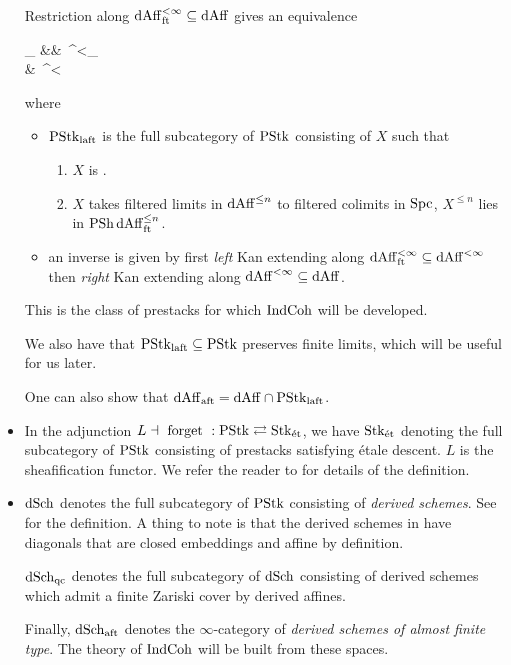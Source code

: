 \documentclass[./main.tex]{subfiles}
\begin{document}
\begin{itemize}
\begin{prop}
		Restriction along $\mathrm{dAff}^{<\infty}_{\mathrm{ft}} \subseteq \mathrm{dAff}$
		gives an equivalence \begin{cd}
			{\PSTK_\LAFT} && {\PSH\,\DAFF^{<\infty}_\FT} \\
			& {\PSH\,\DAFF^{<\infty}}
			\arrow["{\mathrm{res}}", shift left=2, from=1-1, to=1-3]
			\arrow["\sim"{description}, draw=none, from=1-1, to=1-3]
			\arrow[shift left=2, from=1-3, to=1-1]
			\arrow["\RAN", shorten >=3pt, from=2-2, to=1-1]
			\arrow["\LAN", shorten <=4pt, from=1-3, to=2-2]
		\end{cd}
		where \begin{itemize}
			\item $\mathrm{PStk}_{\mathrm{laft}}$ is the full subcategory of $\mathrm{PStk}$ consisting of
      $X$ such that \begin{enumerate}
				\item $X$ is .
        \item $X$ takes filtered limits in $\mathrm{dAff}^{\leq n}$ to 
				filtered colimits in $\mathrm{Spc}$,
				$X^{\leq n}$ lies in $\mathrm{PSh}\,\mathrm{dAff}^{\leq n}_{\mathrm{ft}}$.
			\end{enumerate}
			\item an inverse is given by 
			first \emph{left} Kan extending along 
			$\mathrm{dAff}^{<\infty}_{\mathrm{ft}} \subseteq \mathrm{dAff}^{<\infty}$
			then \emph{right} Kan extending along $\mathrm{dAff}^{<\infty} \subseteq \mathrm{dAff}$.
		\end{itemize}
		\cite[Ch 2, 1.7.6]{GR1}
	\end{prop}
	This is the class of prestacks for which
	$\mathrm{IndCoh}$ will be developed.

  We also have that
	$\mathrm{PStk}_{\mathrm{laft}} \subseteq \mathrm{PStk}$ preserves finite limits,
	which will be useful for us later.
	\cite[Ch 2 , 1.7.10]{GR1}

  One can also show that
	$\mathrm{dAff}_{\mathrm{aft}} = \mathrm{dAff} \cap \mathrm{PStk}_{\mathrm{laft}}$.
	\cite[Ch 2 , 1.7.2]{GR1}

	\item In the adjunction 
	$L \dashv \text{ forget } : \mathrm{PStk} \rightleftarrows \mathrm{Stk}_\text{ét}$,
	we have $\mathrm{Stk}_\text{ét}$ denoting the full subcategory of $\mathrm{PStk}$
	consisting of prestacks satisfying étale descent.
	$L$ is the sheafification functor.
	We refer the reader to \cite[Ch 2, 2.3]{GR1}
	for details of the definition.

	\item $\mathrm{dSch}$ denotes the full subcategory of $\mathrm{PStk}$ consisting of
	\emph{derived schemes}. 
	See \cite[Ch 2, 3.1.1]{GR1} for the definition.
	A thing to note is that the derived schemes in \cite{GR1}
	have diagonals that are closed embeddings and affine by definition.

	$\mathrm{dSch}_\mathrm{qc}$ denotes the full subcategory of $\mathrm{dSch}$
	consisting of derived schemes which admit a finite Zariski cover by
	derived affines.

	Finally, $\mathrm{dSch}_{\mathrm{aft}}$ denotes the $\infty$-category of
	\emph{derived schemes of almost finite type}.
	\cite[Ch 2, 3.5]{GR1}
	The theory of $\mathrm{IndCoh}$ will be built from these spaces.
	
\end{itemize}
\end{document}
